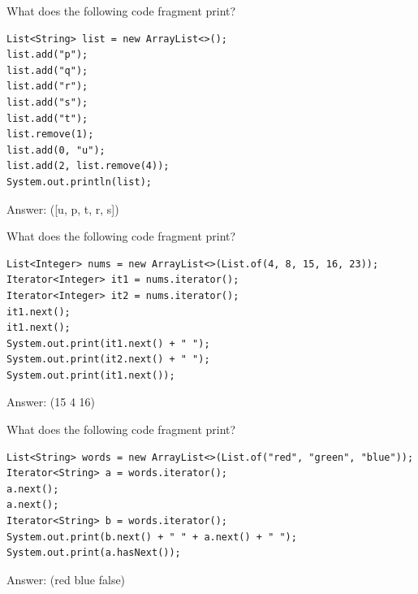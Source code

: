 \begin{question}
What does the following code fragment print?

\begin{lstlisting}
List<String> list = new ArrayList<>();
list.add("p");
list.add("q");
list.add("r");
list.add("s");
list.add("t");
list.remove(1);
list.add(0, "u");
list.add(2, list.remove(4));
System.out.println(list);
\end{lstlisting}

Answer: \underline{\hspace{2in}} \ifanswers ([u, p, t, r, s])\fi
\end{question}


\begin{question}
What does the following code fragment print?

\begin{lstlisting}
List<Integer> nums = new ArrayList<>(List.of(4, 8, 15, 16, 23));
Iterator<Integer> it1 = nums.iterator();
Iterator<Integer> it2 = nums.iterator();
it1.next();
it1.next();
System.out.print(it1.next() + " ");
System.out.print(it2.next() + " ");
System.out.print(it1.next());
\end{lstlisting}

Answer: \underline{\hspace{1.5in}} \ifanswers (15 4 16)\fi
\end{question}

\begin{question}
What does the following code fragment print?

\begin{lstlisting}
List<String> words = new ArrayList<>(List.of("red", "green", "blue"));
Iterator<String> a = words.iterator();
a.next();
a.next();
Iterator<String> b = words.iterator();
System.out.print(b.next() + " " + a.next() + " ");
System.out.print(a.hasNext());
\end{lstlisting}

Answer: \underline{\hspace{1.5in}} \ifanswers (red blue false)\fi
\end{question}
